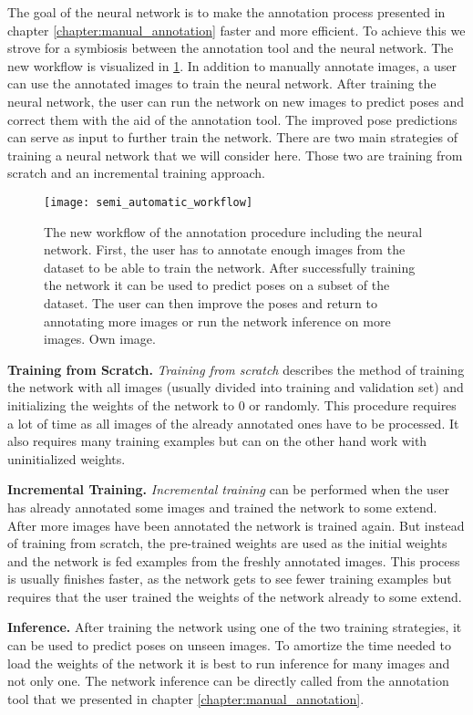 The goal of the neural network is to make the annotation process presented in chapter \ref{chapter:manual_annotation} faster and more efficient. To achieve this we strove for a symbiosis between the annotation tool and the neural network. The new workflow is visualized in \fig \ref{fig:semi_automatic_workflow}. In addition to manually annotate images, a user can use the annotated images to train the neural network. After training the neural network, the user can run the network on new images to predict poses and correct them with the aid of the annotation tool. The improved pose predictions can serve as input to further train the network. There are two main strategies of training a neural network that we will consider here. Those two are training from scratch and an incremental training approach.

\begin{figure}[!tbp]
	\centering
    \texttt{[image: semi\_automatic\_workflow]}
    \caption{The new workflow of the annotation procedure including the neural network. First, the user has to annotate enough images from the dataset to be able to train the network. After successfully training the network it can be used to predict poses on a subset of the dataset. The user can then improve the poses and return to annotating more images or run the network inference on more images. Own image.}
    	\label{fig:semi_automatic_workflow}
\end{figure}

\noindent\textbf{Training from Scratch.} \textit{Training from scratch} describes the method of training the network with all images (usually divided into training and validation set) and initializing  the weights of the network to 0 or randomly. This procedure requires a lot of time as all images of the already annotated ones have to be processed. It also requires many training examples but can on the other hand work with uninitialized weights.

\noindent\textbf{Incremental Training.} \textit{Incremental training} can be performed when the user has already annotated some images and trained the network to some extend. After more images have been annotated the network is trained again. But instead of training from scratch, the pre-trained weights are used as the initial weights and the network is fed examples from the freshly annotated images. This process is usually finishes faster, as the network gets to see fewer training examples but requires that the user trained the weights of the network already to some extend.

\noindent\textbf{Inference.}  After training the network using one of the two training strategies, it can be used to predict poses on unseen images. To amortize the time needed to load the weights of the network it is best to run inference for many images and not only one. The network inference can be directly called from the annotation tool that we presented in chapter \ref{chapter:manual_annotation}.